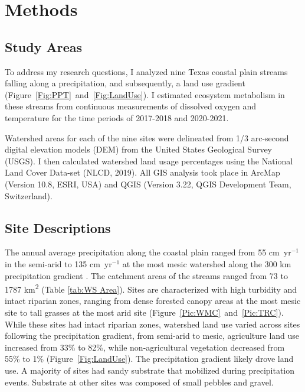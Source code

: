%

\chapter[METHODS]{Methods} 
\section{Study Areas}
To address my research questions, I analyzed nine Texas coastal plain streams falling along a precipitation, and subsequently, a land use gradient (Figure~\ref{Fig:PPT}~and~\ref{Fig:LandUse}). I estimated ecosystem metabolism in these streams from continuous measurements of dissolved oxygen and temperature for the time periods of 2017-2018 and 2020-2021.

Watershed areas for each of the nine sites were delineated from 1/3 arc-second digital elevation models (DEM) from the United States Geological Survey (USGS). I then calculated watershed land usage percentages using the National Land Cover Data-set (NLCD, 2019). All GIS analysis took place in ArcMap (Version 10.8, ESRI, USA) and QGIS (Version 3.22, QGIS Development Team, Switzerland).

\section{Site Descriptions}
The annual average precipitation along the coastal plain ranged from 55 cm~yr$^{-1}$ in the semi-arid to 135 cm~yr$^{-1}$ at the most mesic watershed along the 300 km precipitation gradient \cite{PRISM}. The catchment areas of the streams ranged from 73 to 1787 \unit{\square\km} (Table \ref{tab:WS Area}). Sites are characterized with high turbidity and intact riparian zones, ranging from dense forested canopy areas at the most mesic site to tall grasses at the most arid site (Figure~\ref{Pic:WMC}~and~\ref{Pic:TRC}). While these sites had intact riparian zones, watershed land use varied across sites following the precipitation gradient, from semi-arid to mesic, agriculture land use increased from 33\% to 82\%, while non-agricultural vegetation decreased from 55\% to 1\% (Figure~\ref{Fig:LandUse}). The precipitation gradient likely drove land use. A majority of sites had sandy substrate that mobilized during precipitation events. Substrate at other sites was composed of small pebbles and gravel. 

